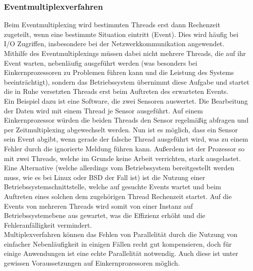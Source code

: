 \subsubsection{Eventmultiplexverfahren}
Beim Eventmultiplexing wird bestimmten Threads erst dann Rechenzeit zugeteilt, wenn eine bestimmte Situation eintritt (Event). Dies wird häufig bei \ac{I/O} Zugriffen, insbesondere bei der Netzwerkkommunikation angewendet. Mithilfe des Eventmultiplexings müssen dabei nicht mehrere Threads, die auf ihr Event warten, nebenläufig ausgeführt werden (was besonders bei Einkernprozessoren zu Problemen führen kann und die Leistung des Systems beeinträchtigt), sondern das Betriebssystem übernimmt diese Aufgabe und startet die in Ruhe versetzten Threads erst beim Auftreten des erwarteten Events. \cite{Han_Event_Multiplexing}\\
Ein Beispiel dazu ist eine Software, die zwei Sensoren auswertet. Die Bearbeitung der Daten wird mit einem Thread je Sensor ausgeführt. Auf einem Einkernprozessor würden die beiden Threads den Sensor regelmäßig abfragen und per Zeitmultiplexing abgewechselt werden. Nun ist es möglich, dass ein Sensor sein Event abgibt, wenn gerade der falsche Thread ausgeführt wird, was zu einem Fehler durch die ignorierte Meldung führen kann. Außerdem ist der Prozessor so mit zwei Threads, welche im Grunde keine Arbeit verrichten, stark ausgelastet. Eine Alternative (welche allerdings vom Betriebssystem bereitgestellt werden muss, wie es bei Linux \cite{Linux_Manual_Epoll} oder BSD \cite{BSD_Manual_Kqueue} der Fall ist) ist die Nutzung einer Betriebssystemschnittstelle, welche auf gesuchte Events wartet und beim Auftreten eines solchen dem zugehörigen Thread Rechenzeit startet. Auf die Events von mehreren Threads wird somit von einer Instanz auf Betriebssystemebene aus gewartet, was die Effizienz erhöht und die Fehleranfälligkeit vermindert.\\[0.5cm]
Multiplexverfahren können das Fehlen von Parallelität durch die Nutzung von einfacher Nebenläufigkeit in einigen Fällen recht gut kompensieren, doch für einige Anwendungen ist eine echte Parallelität notwendig. Auch diese ist unter gewissen Voraussetzungen auf Einkernprozessoren möglich.


